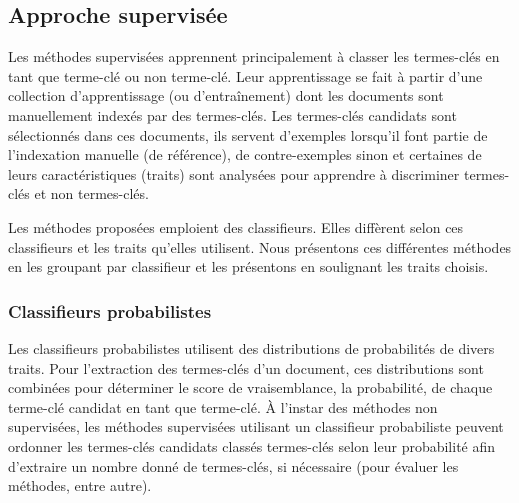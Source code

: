     \subsection{Approche supervisée}
    \label{subsec:main-state_of_the_art-automatic_keyphrase_extraction-supervised_keyphrase_extraction}
      Les méthodes supervisées apprennent principalement à classer les
      termes-clés en tant que \og{}terme-clé\fg{} ou \og{}non terme-clé\fg{}.
      Leur apprentissage se fait à partir d'une collection d'apprentissage (ou
      d'entraînement) dont les documents sont manuellement indexés par des
      termes-clés. Les termes-clés candidats sont sélectionnés dans ces
      documents, ils servent d'exemples lorsqu'il font partie de l'indexation
      manuelle (de référence), de contre-exemples sinon et certaines de leurs
      caractéristiques (traits) sont analysées pour apprendre à discriminer
      \og{}termes-clés\fg{} et \og{}non termes-clés\fg{}.

      Les méthodes proposées emploient des classifieurs. Elles diffèrent selon
      ces classifieurs et les traits qu'elles utilisent. Nous présentons ces
      différentes méthodes en les groupant par classifieur et les présentons en
      soulignant les traits choisis.

      \subsubsection{Classifieurs probabilistes}
      \label{subsubsec:main-state_of_the_art-automatic_keyphrase_extraction-supervised_keyphrase_extraction-probabilistic_models}
        Les classifieurs probabilistes utilisent des distributions de
        probabilités de divers traits. Pour l'extraction des termes-clés d'un
        document, ces distributions sont combinées pour déterminer le score de
        vraisemblance, la probabilité, de chaque terme-clé candidat en tant que
        \og{}terme-clé\fg{}. À l'instar des méthodes non supervisées, les
        méthodes supervisées utilisant un classifieur probabiliste peuvent
        ordonner les termes-clés candidats classés \og{}termes-clés\fg{} selon
        leur probabilité afin d'extraire un nombre donné de termes-clés, si
        nécessaire (pour évaluer les méthodes, entre autre).

